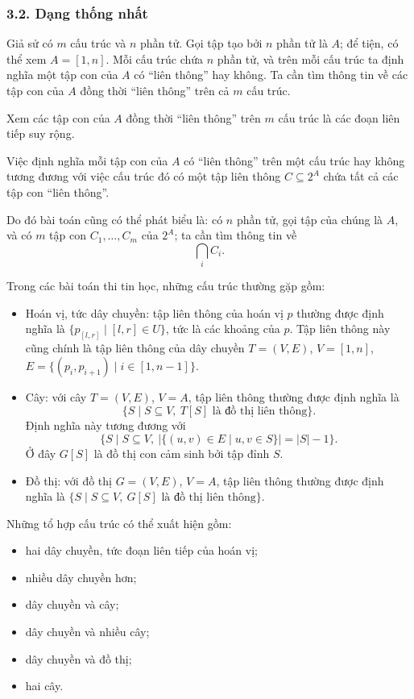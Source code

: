 \documentclass[11pt]{article}
\begin{document}
\subsubsection*{3.2. Dạng thống nhất}

Giả sử có $m$ cấu trúc và $n$ phần tử. Gọi tập tạo bởi $n$ phần tử là $A$; để
tiện, có thể xem $A=[1,n]$. Mỗi cấu trúc chứa $n$ phần tử, và trên mỗi cấu
trúc ta định nghĩa một tập con của $A$ có ``liên thông'' hay không. Ta cần tìm
thông tin về các tập con của $A$ đồng thời ``liên thông'' trên cả $m$ cấu
trúc.

Xem các tập con của $A$ đồng thời ``liên thông'' trên $m$ cấu trúc là các đoạn
liên tiếp suy rộng.

Việc định nghĩa mỗi tập con của $A$ có ``liên thông'' trên một cấu trúc hay
không tương đương với việc cấu trúc đó có một tập liên thông
$C\subseteq 2^A$ chứa tất cả các tập con ``liên thông''.

Do đó bài toán cũng có thể phát biểu là: có $n$ phần tử, gọi tập của chúng là
$A$, và có $m$ tập con $C_1,\ldots,C_m$ của $2^A$; ta cần tìm thông tin về
\[
  \bigcap_i C_i .
\]

Trong các bài toán thi tin học, những cấu trúc thường gặp gồm:
\begin{itemize}
  \item Hoán vị, tức dây chuyền: tập liên thông của hoán vị $p$ thường được
  định nghĩa là $\{p_{[l,r]}\mid [l,r]\in U\}$, tức là các khoảng của $p$.
  Tập liên thông này cũng chính là tập liên thông của dây chuyền
  $T=(V,E)$, $V=[1,n]$,
  $E=\{(p_i,p_{i+1})\mid i\in[1,n-1]\}$.
  \item Cây: với cây $T=(V,E)$, $V=A$, tập liên thông thường được định nghĩa là
  \[
    \{S\mid S\subseteq V,\ T[S]\text{ là đồ thị liên thông}\}.
  \]
  Định nghĩa này tương đương với
  \[
    \{S\mid S\subseteq V,\ |\{(u,v)\in E\mid u,v\in S\}|=|S|-1\}.
  \]
  Ở đây $G[S]$ là đồ thị con cảm sinh bởi tập đỉnh $S$.
  \item Đồ thị: với đồ thị $G=(V,E)$, $V=A$, tập liên thông thường được định
  nghĩa là $\{S\mid S\subseteq V,\ G[S]\text{ là đồ thị liên thông}\}$.
\end{itemize}

Những tổ hợp cấu trúc có thể xuất hiện gồm:
\begin{itemize}
  \item hai dây chuyền, tức đoạn liên tiếp của hoán vị;
  \item nhiều dây chuyền hơn;
  \item dây chuyền và cây;
  \item dây chuyền và nhiều cây;
  \item dây chuyền và đồ thị;
  \item hai cây.
\end{itemize}
\end{document}
